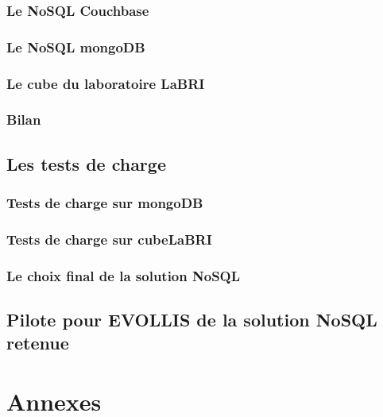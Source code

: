                 \section{Le \textsf{NoSQL Couchbase}}\label{membase}
                

                \section{Le \textsf{NoSQL mongoDB}}\label{mongodb}
                

                \section{Le \textsf{cube} du laboratoire \textsf{LaBRI}}\label{cube}
                

                \section{Bilan}
                

      \chapter{Les tests de charge}

                \section{Tests de charge sur \textsf{mongoDB}}

                \section{Tests de charge sur \textsf{cubeLaBRI}}
     
                \section{Le choix final de la solution \textsf{NoSQL}}

      \chapter{Pilote pour \textsf{EVOLLIS} de la solution \textsf{NoSQL} retenue}

      

\printindex

\nocite{cassandra2}
\nocite{cassandra}
\nocite{NoSQLCmp}
\nocite{NoSQLeurope}
\nocite{NoSQLvsSQL}



\part{Annexes}
\appendix





